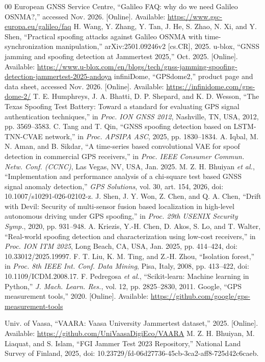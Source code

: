 \documentclass[conference]{IEEEtran}
\begin{document}
\begin{thebibliography}{00}
 European GNSS Service Centre, ``Galileo FAQ: why do we need Galileo OSNMA?,'' accessed Nov. 2026. [Online]. Available: \url{https://www.gsc-europa.eu/galileo/faq}
 H. Wang, Y. Zhang, Y. Tan, J. He, S. Zhao, N. Xi, and Y. Shen, ``Practical spoofing attacks against Galileo OSNMA with time-synchronization manipulation,'' arXiv:2501.09246v2 [cs.CR], 2025.
 u-blox, ``GNSS jamming and spoofing detection at Jammertest 2025,'' Oct. 2025. [Online]. Available: \url{https://www.u-blox.com/en/blogs/tech/gnss-jamming-spoofing-detection-jammertest-2025-andoya}
 infiniDome, ``GPSdome2,'' product page and data sheet, accessed Nov. 2026. [Online]. Available: \url{https://infinidome.com/gps-dome-2/}
 T. E. Humphreys, J. A. Bhatti, D. P. Shepard, and K. D. Wesson, ``The Texas Spoofing Test Battery: Toward a standard for evaluating GPS signal authentication techniques,'' in \emph{Proc. ION GNSS 2012}, Nashville, TN, USA, 2012, pp. 3569--3583.
 C. Tang and T. Qin, ``GNSS spoofing detection based on LSTM-TNN-CVAE network,'' in \emph{Proc. APSIPA ASC}, 2025, pp. 1830--1834.
 A. Iqbal, M. N. Aman, and B. Sikdar, ``A time-series based convolutional VAE for spoof detection in commercial GPS receivers,'' in \emph{Proc. IEEE Consumer Commun. Netw. Conf. (CCNC)}, Las Vegas, NV, USA, Jan. 2025.
 M. Z. H. Bhuiyan \emph{et al.}, ``Implementation and performance analysis of a chi-square test based GNSS signal anomaly detection,'' \emph{GPS Solutions}, vol. 30, art. 154, 2026, doi: 10.1007/s10291-026-02102-z.
 J. Shen, J. Y. Won, Z. Chen, and Q. A. Chen, ``Drift with Devil: Security of multi-sensor fusion based localization in high-level autonomous driving under GPS spoofing,'' in \emph{Proc. 29th USENIX Security Symp.}, 2020, pp. 931--948.
 A. Kriezis, Y.-H. Chen, D. Akos, S. Lo, and T. Walter, ``Real-world spoofing detection and characterization using low-cost receivers,'' in \emph{Proc. ION ITM 2025}, Long Beach, CA, USA, Jan. 2025, pp. 414--424, doi: 10.33012/2025.19997.
 F. T. Liu, K. M. Ting, and Z.-H. Zhou, ``Isolation forest,'' in \emph{Proc. 8th IEEE Int. Conf. Data Mining}, Pisa, Italy, 2008, pp. 413--422, doi: 10.1109/ICDM.2008.17.
 F. Pedregosa \emph{et al.}, ``Scikit-learn: Machine learning in Python,'' \emph{J. Mach. Learn. Res.}, vol. 12, pp. 2825--2830, 2011.
 Google, ``GPS measurement tools,'' 2020. [Online]. Available: \url{https://github.com/google/gps-measurement-tools}

 Univ. of Vaasa, ``VAARA: Vaasa University Jammertest dataset,'' 2025. [Online]. Available: \url{https://github.com/UniVaasaDigiEco/VAARA}
 M. Z. H. Bhuiyan, M. Liaquat, and S. Islam, ``FGI Jammer Test 2023 Repository,'' National Land Survey of Finland, 2025, doi: 10.23729/fd-06d27736-45cb-3ca2-aff8-725d42c6caeb.
\end{thebibliography}
\end{document}
